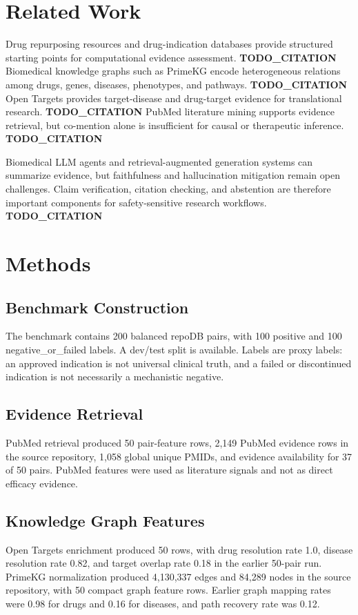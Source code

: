 \documentclass[11pt]{article}
\newcommand{\todoct}{\textbf{TODO\_CITATION}}
\begin{document}
\section{Related Work}
Drug repurposing resources and drug-indication databases provide structured starting points for computational evidence assessment. \todoct{} Biomedical knowledge graphs such as PrimeKG encode heterogeneous relations among drugs, genes, diseases, phenotypes, and pathways. \todoct{} Open Targets provides target-disease and drug-target evidence for translational research. \todoct{} PubMed literature mining supports evidence retrieval, but co-mention alone is insufficient for causal or therapeutic inference. \todoct{}

Biomedical LLM agents and retrieval-augmented generation systems can summarize evidence, but faithfulness and hallucination mitigation remain open challenges. Claim verification, citation checking, and abstention are therefore important components for safety-sensitive research workflows. \todoct{}

\section{Methods}
\subsection{Benchmark Construction}
The benchmark contains 200 balanced repoDB pairs, with 100 positive and 100 negative\_or\_failed labels. A dev/test split is available. Labels are proxy labels: an approved indication is not universal clinical truth, and a failed or discontinued indication is not necessarily a mechanistic negative.

\subsection{Evidence Retrieval}
PubMed retrieval produced 50 pair-feature rows, 2,149 PubMed evidence rows in the source repository, 1,058 global unique PMIDs, and evidence availability for 37 of 50 pairs. PubMed features were used as literature signals and not as direct efficacy evidence.

\subsection{Knowledge Graph Features}
Open Targets enrichment produced 50 rows, with drug resolution rate 1.0, disease resolution rate 0.82, and target overlap rate 0.18 in the earlier 50-pair run. PrimeKG normalization produced 4,130,337 edges and 84,289 nodes in the source repository, with 50 compact graph feature rows. Earlier graph mapping rates were 0.98 for drugs and 0.16 for diseases, and path recovery rate was 0.12.
\end{document}

